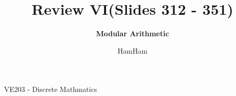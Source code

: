 \documentclass{beamer}
\title{\sffamily Review VI(Slides 312 - 351)}
\subtitle{\textbf{Modular Arithmetic}\\}
\institute[UM-SJTU JI]{University of Michigan-Shanghai Jiao Tong University Joint Institute}
\author{HamHam}
\newcommand{\myfont}{\rmfamily\normalsize\upshape\mdseries}
\begin{document}
\begin{titlepage}
    \begin{center}
        VE203 - Discrete Mathmatics 
    \end{center}
\end{titlepage}
\myfont
\newcommand{\green}[1]{\textcolor[rgb]{0.3,0.6,0}{#1}}
\end{document}

